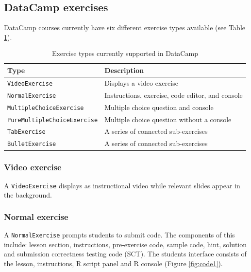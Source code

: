\documentclass{tise_style_doi}
\begin{document}
\subsection{DataCamp exercises}

DataCamp courses currently have six different exercise types available (see
Table \ref{tab:exercises}).

\begin{table}
\begin{tabular}{ll}
\toprule
Type & Description \\
\midrule
\texttt{VideoExercise}              & Displays a video exercise \\
\texttt{NormalExercise}	            & Instructions, exercise, code editor, and console \\
\texttt{MultipleChoiceExercise}     & Multiple choice question and console \\
\texttt{PureMultipleChoiceExercise} & Multiple choice question without a console \\
\texttt{TabExercise}	            & A series of connected sub-exercises \\
\texttt{BulletExercise}	            & A series of connected sub-exercises \\
\bottomrule
\end{tabular}
\caption{Exercise types currently supported in DataCamp}
\label{tab:exercises}
\end{table}

\subsubsection{Video exercise}

A \texttt{VideoExercise} displays as instructional video while relevant
slides appear in the background.

\subsubsection{Normal exercise}

A \texttt{NormalExercise} prompts students to submit code. The components of this
include: lesson section, instructions, pre-exercise code, sample code, hint, solution
and submission correctness testing code (SCT). The students interface consists of the
lesson, instructions, R script panel and R console (Figure \ref{fig:code1}).
\end{document}
